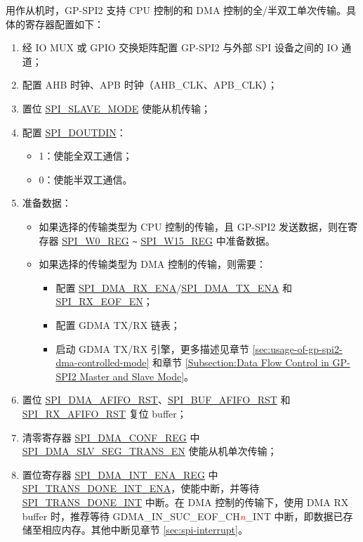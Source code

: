 \documentclass[main\_\_CN.tex]{subfiles}
\begin{document}
用作从机时，GP-SPI2 支持 CPU 控制的和 DMA 控制的全/半双工单次传输。具体的寄存器配置如下：
\begin{enumerate}
    \item 经 IO MUX 或 GPIO 交换矩阵配置 GP-SPI2 与外部 SPI 设备之间的 IO 通道； 
    
    \item 配置 AHB 时钟、APB 时钟（AHB\_CLK、APB\_CLK）；

    \item 置位 \hyperref[fielddesc:SPISLAVEMODE]{SPI\_SLAVE\_MODE} 使能从机传输； 
    
    \item 配置 \hyperref[fielddesc:SPIDOUTDIN]{SPI\_DOUTDIN}：
    \begin{itemize}
        \item 1：使能全双工通信；
        \item 0：使能半双工通信。
    \end{itemize}
    
    \item 准备数据：
    \begin{itemize}
        \item 如果选择的传输类型为 CPU 控制的传输，且 GP-SPI2 发送数据，则在寄存器 \hyperref[regdesc:SPIW0REG]{SPI\_W0\_REG} \verb+~+ \hyperref[regdesc:SPIW0REG]{SPI\_W15\_REG} 中准备数据。
        \item 如果选择的传输类型为 DMA 控制的传输，则需要：
        \begin{itemize}
            \item 配置 \hyperref[fielddesc:SPIDMARXENA]{SPI\_DMA\_RX\_ENA}/\hyperref[fielddesc:SPIDMATXENA]{SPI\_DMA\_TX\_ENA} 和 \hyperref[fielddesc:SPIRXEOFEN]{SPI\_RX\_EOF\_EN}；
            \item 配置 GDMA TX/RX 链表；
            \item 启动 GDMA TX/RX 引擎，更多描述见章节  \ref{sec:usage-of-gp-spi2-dma-controlled-mode} 和章节  \ref{Subsection:Data Flow Control in GP-SPI2 Master and Slave Mode}。
        \end{itemize}
    \end{itemize}
    
    \item 置位 \hyperref[fielddesc:SPIDMAAFIFORST]{SPI\_DMA\_AFIFO\_RST}、\hyperref[fielddesc:SPIBUFAFIFORST]{SPI\_BUF\_AFIFO\_RST} 和 \hyperref[fielddesc:SPIRXAFIFORST]{SPI\_RX\_AFIFO\_RST} 复位 buffer；
    
    \item 清零寄存器 \hyperref[regdesc:SPIDMACONFREG]{SPI\_DMA\_CONF\_REG} 中 \hyperref[fielddesc:SPIDMASLVSEGTRANSEN]{SPI\_DMA\_SLV\_SEG\_TRANS\_EN} 使能从机单次传输；
    
    \item 置位寄存器 \hyperref[regdesc:SPIDMAINTENAREG]{SPI\_DMA\_INT\_ENA\_REG} 中 \hyperref[fielddesc:SPITRANSDONEINTENA]{SPI\_TRANS\_DONE\_INT\_ENA}，使能中断，并等待 \hyperref[int:SPITRANSDONEINT]{SPI\_TRANS\_DONE\_INT} 中断。在 DMA 控制的传输下，使用 DMA RX buffer 时，推荐等待 GDMA\_IN\_SUC\_EOF\_CH\textcolor{red}{\it{n}}\_INT 中断，即数据已存储至相应内存。其他中断见章节 \ref{sec:spi-interrupt}。
\end{enumerate}
\end{document}
